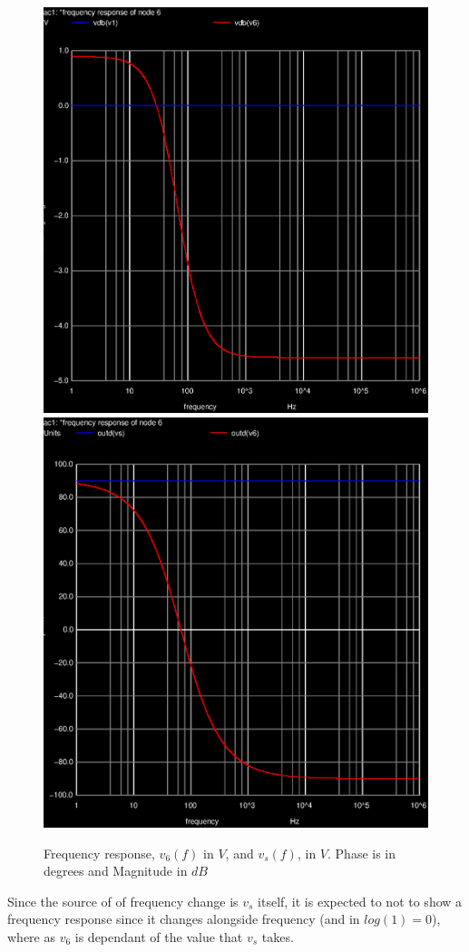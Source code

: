 \begin{figure}[!ht] \centering
\caption{Frequency response, $v_{6}(f)$ in $V$, and $v_s(f)$, in $V$. Phase is in degrees and Magnitude in $dB$}
\includegraphics[width=0.45\linewidth]{acm.eps}
\includegraphics[width=0.45\linewidth]{acm2.eps}
\label{fig:simulation_5}
\end{figure}

Since the source of of frequency change is $v_s$ itself, it is expected to not to show a frequency response since it changes alongside frequency (and in $log(1) = 0$), where as $v_6$ is dependant of the value that $v_s$ takes. 







